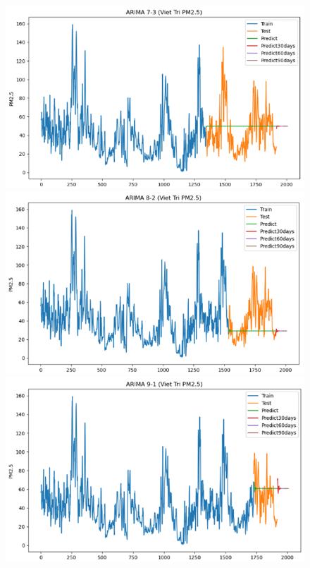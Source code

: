 \begin{figure}[H]
{\begin{adjustbox}{minipage=0.48\textwidth}
            \begin{minipage}{0.3\textwidth}
                \centering
                \includegraphics[width=\textwidth, height=0.5\textwidth]{img/final/ARIMA/90D/ARIMA_7_3_VT.png}\\
                \includegraphics[width=\textwidth, height=0.5\textwidth]{img/final/ARIMA/90D/ARIMA_8_2_VT.png}\\
                \includegraphics[width=\textwidth]{img/final/ARIMA/90D/ARIMA_9_1_VT.png}
            \end{minipage}

\end{adjustbox}}
\end{figure}
